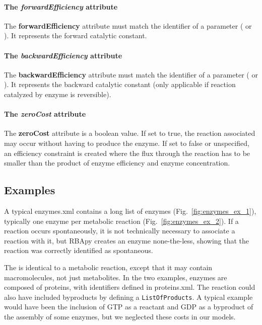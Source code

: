 \paragraph{The \textit{forwardEfficiency} attribute}
The \textbf{forwardEfficiency} attribute must match the identifier of a
parameter (\function{} or \aggregate{}).
It represents the forward catalytic constant.

\paragraph{The \textit{backwardEfficiency} attribute}
The \textbf{backwardEfficiency} attribute must match the identifier of a
parameter (\function{} or \aggregate{}).
It represents the backward catalytic constant
(only applicable if reaction catalyzed by enzyme is reversible).

\paragraph{The \textit{zeroCost} attribute}
The \textbf{zeroCost} attribute is a boolean value.
If set to true, the reaction associated may occur without having to produce
the enzyme.
If set to false or unspecified, an efficiency constraint is created where the
flux through the reaction has to be smaller than the product of enzyme
efficiency and enzyme concentration.

\subsection{Examples}

A typical enzymes.xml contains a long list of enzymes
(Fig.~\ref{fig:enzymes_ex_1}),
typically one enzyme per metabolic reaction (Fig.~\ref{fig:enzymes_ex_2}).
If a reaction occurs spontaneously, it is not technically necessary to
associate a reaction with it, but RBApy creates an enzyme none-the-less,
showing that the reaction was correctly identified as spontaneous.

The \machinerycomposition{} is identical to a metabolic reaction,
except that it may contain macromolecules, not just metabolites.
In the two examples, enzymes are composed of proteins, with identifiers
defined in proteins.xml.
The reaction could also have included byproducts by defining a \texttt{ListOfProducts}.
A typical example would have been the inclusion of GTP as a reactant and GDP
as a byproduct of the assembly of some enzymes, but we neglected these costs in our models.


